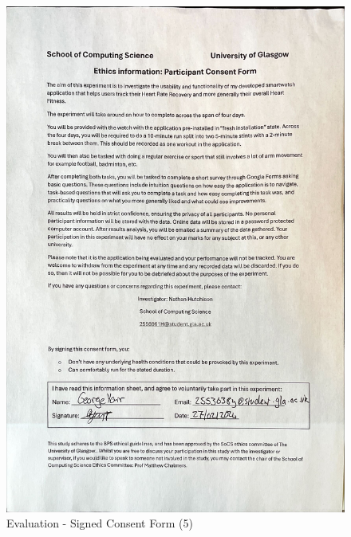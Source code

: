 \documentclass{l4proj}
\begin{document}
\begin{figure}[h!]
    \centering
    \includegraphics[width=1\linewidth]{dissertation//dissImages/Consent5.jpg}
    \caption{Evaluation - Signed Consent Form (5)}
\end{figure}
\end{document}
